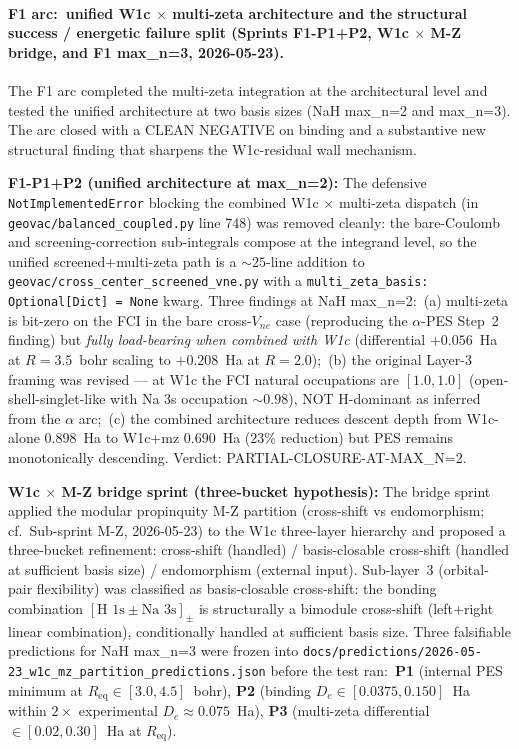 \documentclass[aps,pra,twocolumn,superscriptaddress,longbibliography]{revtex4-2}
\begin{document}
\paragraph{F1 arc:\ unified W1c $\times$ multi-zeta architecture and the
structural success / energetic failure split (Sprints F1-P1+P2, W1c $\times$
M-Z bridge, and F1 max\_n=3, 2026-05-23).}
The F1 arc completed the multi-zeta integration at the architectural
level and tested the unified architecture at two basis sizes
(NaH max\_n=2 and max\_n=3). The arc closed with a CLEAN NEGATIVE on
binding and a substantive new structural finding that sharpens the
W1c-residual wall mechanism.

\textbf{F1-P1+P2 (unified architecture at max\_n=2):} The defensive
\texttt{NotImplementedError} blocking the combined W1c $\times$ multi-zeta
dispatch (in \texttt{geovac/balanced\_coupled.py} line 748) was removed
cleanly: the bare-Coulomb and screening-correction sub-integrals compose
at the integrand level, so the unified screened+multi-zeta path is a
${\sim}25$-line addition to \texttt{geovac/cross\_center\_screened\_vne.py}
with a \texttt{multi\_zeta\_basis: Optional[Dict] = None} kwarg. Three
findings at NaH max\_n=2:\ (a) multi-zeta is bit-zero on the FCI in the
bare cross-$V_{ne}$ case (reproducing the $\alpha$-PES Step~2 finding) but
\emph{fully load-bearing when combined with W1c} (differential $+0.056$~Ha
at $R = 3.5$~bohr scaling to $+0.208$~Ha at $R = 2.0$);\ (b) the original
Layer-3 framing was revised --- at W1c the FCI natural occupations are
$[1.0, 1.0]$ (open-shell-singlet-like with Na 3s occupation ${\sim}0.98$),
NOT H-dominant as inferred from the $\alpha$ arc;\ (c) the combined
architecture reduces descent depth from W1c-alone $0.898$~Ha to
W1c+mz $0.690$~Ha ($23\%$ reduction) but PES remains monotonically
descending. Verdict: PARTIAL-CLOSURE-AT-MAX\_N=2.

\textbf{W1c $\times$ M-Z bridge sprint (three-bucket hypothesis):} The bridge
sprint applied the modular propinquity M-Z partition (cross-shift vs
endomorphism; cf.\ Sub-sprint M-Z, 2026-05-23) to the W1c three-layer
hierarchy and proposed a three-bucket refinement: cross-shift
(handled) / basis-closable cross-shift (handled at sufficient basis
size) / endomorphism (external input). Sub-layer~3 (orbital-pair
flexibility) was classified as basis-closable cross-shift: the bonding
combination $[\text{H 1s} \pm \text{Na 3s}]_\pm$ is structurally a
bimodule cross-shift (left+right linear combination), conditionally
handled at sufficient basis size. Three falsifiable predictions for
NaH max\_n=3 were frozen into
\texttt{docs/predictions/2026-05-23\_w1c\_mz\_partition\_predictions.json} before
the test ran:\  \textbf{P1} (internal PES minimum at $R_\text{eq} \in
[3.0, 4.5]$~bohr), \textbf{P2} (binding $D_e \in [0.0375, 0.150]$~Ha
within $2\times$ experimental $D_e \approx 0.075$~Ha), \textbf{P3}
(multi-zeta differential $\in [0.02, 0.30]$~Ha at $R_\text{eq}$).
\end{document}
